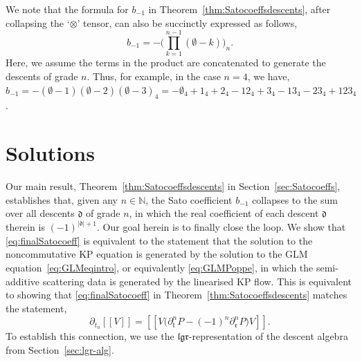 \documentclass[5p,twocolumn]{elsarticle}
\newcommand*{\pa}{{\partial}}
\newcommand*{\lb}{[\![}
\newcommand*{\rb}{]\!]}
\newcommand*{\el}{\mathfrak l}
\newcommand*{\gl}{\mathfrak g}
\newcommand*{\rl}{\mathfrak r}
\newcommand*{\df}{\mathfrak d}
\newcommand*{\botimes}{\boldsymbol{\otimes}}
\begin{document}
%
\begin{remark}
We note that the formula for $b_{-1}$ in Theorem~\ref{thm:Satocoeffsdescents}, after collapsing the `$\botimes$' tensor, can also be succinctly expressed as follows,
\begin{equation*}
   b_{-1}=-\Biggl(\prod_{k=1}^{n-1}(\emptyset-k)\Biggr)_n. 
\end{equation*}
Here, we assume the terms in the product are concatenated to generate the descents of grade $n$.
Thus, for example, in the case $n=4$, we have, $ b_{-1}=-(\emptyset-1)(\emptyset-2)(\emptyset-3)_4=-\emptyset_4+1_4+2_4-12_4+3_4-13_4-23_4+123_4$.
\end{remark}
%



\section{Solutions}\label{sec:solutions}     
Our main result, Theorem~\ref{thm:Satocoeffsdescents} in Section~\ref{sec:Satocoeffs}, establishes that, given any $n\in\mathbb N$,
the Sato coefficient $b_{-1}$ collapses to the sum over all descents $\df$ of grade $n$, in which the real coefficient of each descent $\df$ therein is $(-1)^{|\df|+1}$.
Our goal herein is to finally close the loop.
We show that \eqref{eq:finalSatocoeff} is equivalent to the statement that the solution to the noncommutative KP equation is generated
by the solution to the GLM equation~\eqref{eq:GLMeqintro}, or equivalently \eqref{eq:GLMPoppe}, in which the semi-additive scattering data is generated by the linearised KP flow.
This is equivalent to showing that \eqref{eq:finalSatocoeff} in Theorem~\ref{thm:Satocoeffsdescents} matches the statement,
\begin{equation}\label{eq:PoppeVkernel}
   \pa_{t_n}\lb V\rb=\lb V\bigl(\pa_{\el}^nP-(-1)^n\pa_{\rl}^nP\bigr)V\rb.
\end{equation}
To establish this connection, we use the $\el\gl\rl$-representation of the descent algebra from Section~\ref{sec:lgr-alg}.
\end{document}
